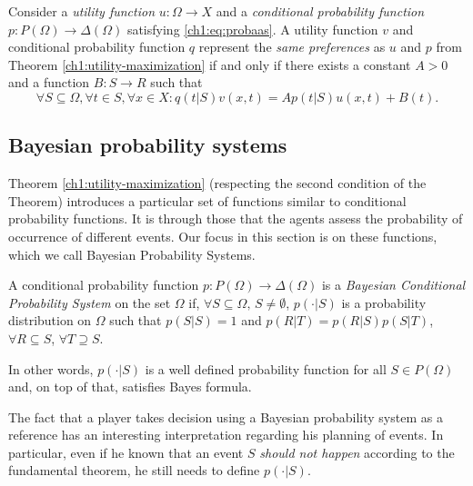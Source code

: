 \begin{theorem}
Consider a \emph{utility function} $u : \Omega \rightarrow X$ and a \emph{conditional probability function} $p : P(\Omega) \rightarrow \Delta(\Omega)$ satisfying \ref{ch1:eq:probaas}.
A utility function $v$ and conditional probability function $q$ represent the \emph{same preferences} as $u$ and $p$ from Theorem \ref{ch1:utility-maximization} if and only if there  exists a constant $A > 0$ and a function $B : S \rightarrow R$ such that
$$ \forall S \subseteq \Omega, \forall t \in S, \forall x \in X: q(t|S) v(x,t) = Ap(t|S)u(x,t) + B(t). $$
\label{chap1:thm:Equivalent}
\end{theorem}


\subsection{Bayesian probability systems}

Theorem \ref{ch1:utility-maximization} (respecting the second condition of the Theorem) introduces a particular set of functions similar to conditional probability functions. It is through those that the agents assess the probability of occurrence of different events. Our focus in this section is on these functions, which we call Bayesian Probability Systems.

\begin{definition}
A conditional probability function $p: P(\Omega) \rightarrow \Delta(\Omega)$ is a \emph{Bayesian Conditional Probability System} on the set $\Omega$ if, $\forall S \subseteq \Omega, \, S \neq \emptyset$, $p(\cdot|S)$ is a probability distribution on $\Omega$ such that $p(S|S) = 1$ and $p(R|T) = p(R|S) p(S|T)$, $\forall R \subseteq S$, $\forall T \supseteq S.$
\end{definition}

In other words, $p(\cdot|S)$  is a well defined probability function for all $S \in P(\Omega)$ and, on top of that, satisfies Bayes formula.


The fact that a player takes decision using a Bayesian probability system as a reference has an interesting interpretation regarding his planning of events. In particular, even if he known that  an event $S$ \emph{should not happen} according to the fundamental theorem, he still needs to define $p(\cdot|S)$.

